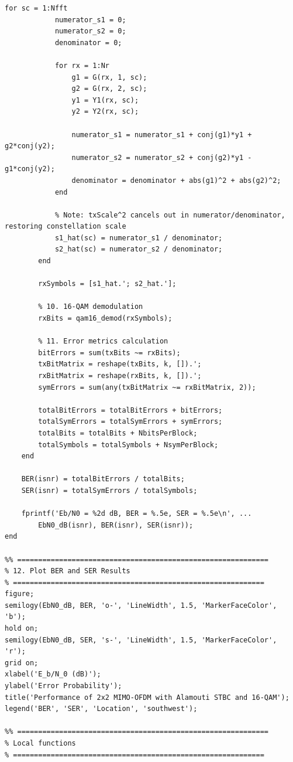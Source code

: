 \documentclass[a4paper]{article}
\begin{document}
\begin{lstlisting}[style=matlabstyle]
        for sc = 1:Nfft
            numerator_s1 = 0;
            numerator_s2 = 0;
            denominator = 0;

            for rx = 1:Nr
                g1 = G(rx, 1, sc);
                g2 = G(rx, 2, sc);
                y1 = Y1(rx, sc);
                y2 = Y2(rx, sc);

                numerator_s1 = numerator_s1 + conj(g1)*y1 + g2*conj(y2);
                numerator_s2 = numerator_s2 + conj(g2)*y1 - g1*conj(y2);
                denominator = denominator + abs(g1)^2 + abs(g2)^2;
            end

            % Note: txScale^2 cancels out in numerator/denominator, restoring constellation scale
            s1_hat(sc) = numerator_s1 / denominator;
            s2_hat(sc) = numerator_s2 / denominator;
        end

        rxSymbols = [s1_hat.'; s2_hat.'];

        % 10. 16-QAM demodulation
        rxBits = qam16_demod(rxSymbols);

        % 11. Error metrics calculation
        bitErrors = sum(txBits ~= rxBits);
        txBitMatrix = reshape(txBits, k, []).';
        rxBitMatrix = reshape(rxBits, k, []).';
        symErrors = sum(any(txBitMatrix ~= rxBitMatrix, 2));

        totalBitErrors = totalBitErrors + bitErrors;
        totalSymErrors = totalSymErrors + symErrors;
        totalBits = totalBits + NbitsPerBlock;
        totalSymbols = totalSymbols + NsymPerBlock;
    end

    BER(isnr) = totalBitErrors / totalBits;
    SER(isnr) = totalSymErrors / totalSymbols;

    fprintf('Eb/N0 = %2d dB, BER = %.5e, SER = %.5e\n', ...
        EbN0_dB(isnr), BER(isnr), SER(isnr));
end

%% ============================================================
% 12. Plot BER and SER Results
% ============================================================
figure;
semilogy(EbN0_dB, BER, 'o-', 'LineWidth', 1.5, 'MarkerFaceColor', 'b');
hold on;
semilogy(EbN0_dB, SER, 's-', 'LineWidth', 1.5, 'MarkerFaceColor', 'r');
grid on;
xlabel('E_b/N_0 (dB)');
ylabel('Error Probability');
title('Performance of 2x2 MIMO-OFDM with Alamouti STBC and 16-QAM');
legend('BER', 'SER', 'Location', 'southwest');

%% ============================================================
% Local functions
% ============================================================


\end{lstlisting}
\end{document}
